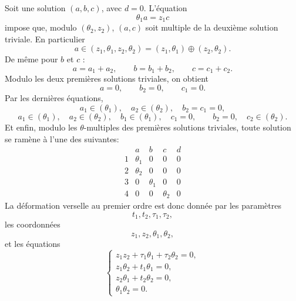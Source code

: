 \documentclass[11pt]{article}
\begin{document}
Soit une solution $(a,b,c)$, avec $d=0$. L'équation
\[
  \theta_1 a=z_1c
\]
impose que, modulo $(\theta_2,z_2)$, $(a,c)$ soit multiple de la deuxième solution triviale. En particulier
\[
  a\in (z_1,\theta_1,z_2,\theta_2)=(z_1,\theta_1)\oplus(z_2,\theta_2).
\]
De même pour $b$ et $c$ :
\[
  a=a_1+a_2,
  \qquad b=b_1+b_2,
  \qquad c=c_1+c_2.
\]
Modulo les deux premières solutions triviales, on obtient
\[
  a=0,\qquad b_2=0,\qquad c_1=0.
\]
Par les dernières équations,
\[
  a_1\in(\theta_1),\quad a_2\in(\theta_2),\quad b_2=c_1=0,
\]
\[
  a_1\in(\theta_1),\quad a_2\in(\theta_2),\quad b_1\in(\theta_1),\quad c_1=0,
  \qquad b_2=0,\quad c_2\in(\theta_2).
\]
Et enfin, modulo les $\theta$-multiples des premières solutions triviales, toute solution se ramène à l'une des suivantes:
\[
\begin{array}{c|cccc}
& a&b&c&d\\ \hline
1&\theta_1&0&0&0\\
2&\theta_2&0&0&0\\
3&0&\theta_1&0&0\\
4&0&0&\theta_2&0
\end{array}
\]
La déformation verselle au premier ordre est donc donnée par les paramètres
\[
  t_1,t_2,\tau_1,\tau_2,
\]
les coordonnées
\[
  z_1,z_2,\theta_1,\theta_2,
\]
et les équations
\[
\begin{cases}
 z_1z_2+\tau_1\theta_1+\tau_2\theta_2=0,\\
 z_1\theta_2+t_1\theta_1=0,\\
 z_2\theta_1+t_2\theta_2=0,\\
 \theta_1\theta_2=0.
\end{cases}
\]
\end{document}
